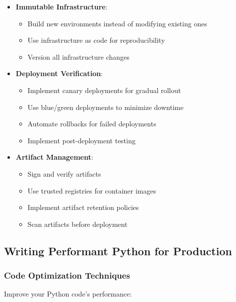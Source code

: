 \begin{itemize}
    \item \textbf{Immutable Infrastructure}:
    \begin{itemize}
        \item Build new environments instead of modifying existing ones
        \item Use infrastructure as code for reproducibility
        \item Version all infrastructure changes
    \end{itemize}
    
    \item \textbf{Deployment Verification}:
    \begin{itemize}
        \item Implement canary deployments for gradual rollout
        \item Use blue/green deployments to minimize downtime
        \item Automate rollbacks for failed deployments
        \item Implement post-deployment testing
    \end{itemize}
    
    \item \textbf{Artifact Management}:
    \begin{itemize}
        \item Sign and verify artifacts
        \item Use trusted registries for container images
        \item Implement artifact retention policies
        \item Scan artifacts before deployment
    \end{itemize}
\end{itemize}

\subsection{Writing Performant Python for Production}

\subsubsection{Code Optimization Techniques}
Improve your Python code's performance:

